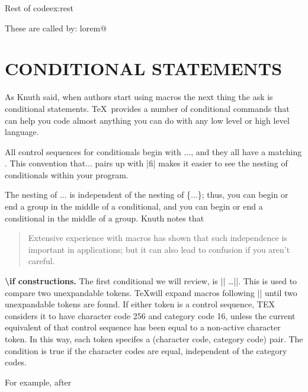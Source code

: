 \begin{texexample}{Rest of code}{ex:rest}
\newcommand\lorem@vi{
\cxset{paragraph format=hang, paragraph color=yellow,}
\paragraph* {Septic Equation} 
   \begin{gather}ax^7+bx^6+cx^5+dx^4+ex^3+fx^2+gx+h=0\end{gather}%
   }
  
These are called by:
\setcounter{lorem@count}{2}
\csname lorem@\endcsname%

\makeatother

\lorems[1-2]
\lorems[5]
\lorems[6]
\end{texexample}



\section*{CONDITIONAL STATEMENTS}

\begin{multicols}{2}
As Knuth said, when authors start using macros the next thing the ask is conditional statements.
\TeX\  provides a number of  conditional commands that can help you code almost anything you can do with any low level or high level language.

All  control sequences for conditionals begin with ...,
and they all have a matching . This convention that... pairs up
with |fi| makes it easier to see the nesting of conditionals within your program. 

The nesting of $\ldots$  is independent of the nesting of \{...\}; thus, you can begin or end
a group in the middle of a conditional, and you can begin or end a conditional in the
middle of a group. Knuth notes that

\begin{quotation}
Extensive experience with macros has shown that such independence
is important in applications; but it can also lead to confusion if you aren't careful.
\end{quotation}

\textbf{\textbackslash if constructions.} \quad The first conditional we will review, is |\if| \ldots |\fi|. This is used to compare two unexpandable tokens. \TeX will expand macros following |\if| until two unexpandable tokens are found. If
either token is a control sequence, TEX considers it to have character code 256 and
category code 16, unless the current equivalent of that control sequence has been 
  equal to a non-active character token. In this way, each token specifes a (character
code, category code) pair. The condition is true if the character codes are equal,
independent of the category codes.

 For example, after 
\end{multicols}


